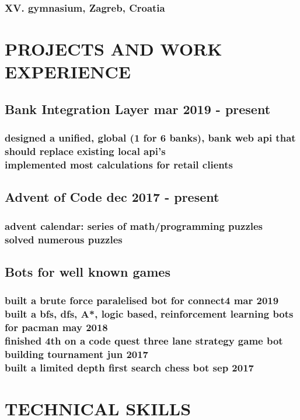 \documentclass{article}
\begin{document}
\subsubsection{XV. gymnasium, Zagreb, Croatia}

\section{PROJECTS AND WORK EXPERIENCE}

\subsection{Bank Integration Layer \hfill mar 2019 - present}
\subsubsection{designed a unified, global (1 for 6 banks), bank web api that should replace existing local api's
\\implemented most calculations for retail clients}

\subsection{Advent of Code \hfill dec 2017 - present}
\subsubsection{advent calendar: series of math/programming puzzles
\\solved numerous puzzles}

\subsection{Bots for well known games}
\subsubsection{built a brute force paralelised bot for connect4 \hfill mar 2019
\\
built a bfs, dfs, A*, logic based, reinforcement learning bots for pacman \hfill may 2018
\\
finished 4th on a code quest three lane strategy game bot building tournament \hfill jun 2017
\\
built a limited depth first search chess bot \hfill sep 2017}

\section{TECHNICAL SKILLS}
\end{document}
